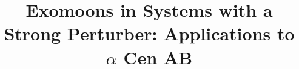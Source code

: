 \documentclass[preprint]{aastex63}
\begin{document}
\title{Exomoons in Systems with a Strong Perturber: Applications to $\alpha$ Cen AB}


\end{document}

